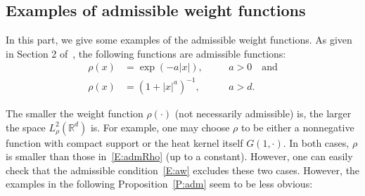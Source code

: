 \documentclass[a4paper,11pt]{article}%
\theoremstyle{plain}
\theoremstyle{definition}
\numberwithin{equation}{section}
\newcommand{\R}{\mathbb{R}}
\begin{document}
\subsection{Examples of admissible weight functions}\label{SS:Weight}

In this part, we give some examples of the admissible weight functions. As given in Section 2
of~\cite{tessitore.zabczyk:98:invariant}, the following functions are admissible functions:
\begin{equation}\label{E:admRho}
\begin{aligned}
\rho(x) & = \exp(-a|x|), \quad               &  & a>0 \quad \text{and} \\
\rho(x) & = \left(1+|x|^a\right)^{-1}, \quad &  & a>d.
\end{aligned}
\end{equation}

The smaller the weight function $\rho(\cdot)$ (not necessarily admissible) is, the larger the space
$L_\rho^2(\R^d)$ is. For example, one may choose $\rho$ to be either a nonnegative function with
compact support or the heat kernel itself $G(1,\cdot)$. In both cases, $\rho$ is smaller than those
in~\eqref{E:admRho} (up to a constant). However, one can easily check that the admissible
condition~\eqref{E:aw} excludes these two cases. However, the examples in the following
Proposition~\ref{P:adm} seem to be less obvious:
\end{document}

